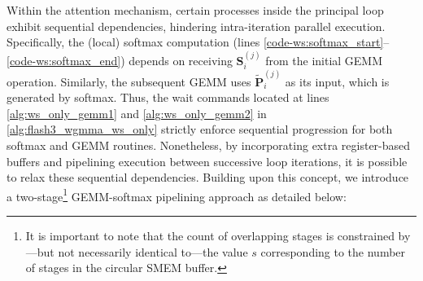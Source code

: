 Within the attention mechanism, certain processes inside the principal loop exhibit sequential dependencies, hindering intra-iteration parallel execution. Specifically, the (local) softmax computation (lines \ref{code-ws:softmax_start}–\ref{code-ws:softmax_end}) depends on receiving $\mathbf{S}_i^{(j)}$ from the initial GEMM operation. Similarly, the subsequent GEMM uses $\widetilde{\mathbf{P}}_i^{(j)}$ as its input, which is generated by softmax. Thus, the wait commands located at lines \ref{alg:ws_only_gemm1} and \ref{alg:ws_only_gemm2} in \cref{alg:flash3_wgmma_ws_only} strictly enforce sequential progression for both softmax and GEMM routines. Nonetheless, by incorporating extra register-based buffers and pipelining execution between successive loop iterations, it is possible to relax these sequential dependencies. Building upon this concept, we introduce a two-stage\footnote{It is important to note that the count of overlapping stages is constrained by—but not necessarily identical to—the value $s$ corresponding to the number of stages in the circular SMEM buffer.} GEMM-softmax pipelining approach as detailed below:

